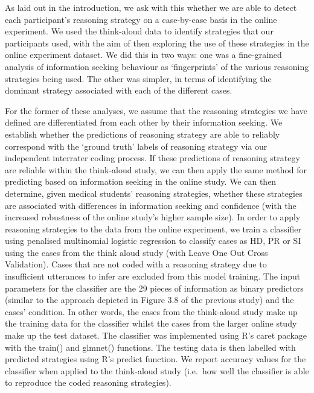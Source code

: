 \documentclass[a4paper, nobind]{templates/ociamthesis}
\begin{document}
As laid out in the introduction, we ask with this whether we are able to detect each participant's reasoning strategy on a case-by-case basis in the online experiment. We used the think-aloud data to identify strategies that our participants used, with the aim of then exploring the use of these strategies in the online experiment dataset. We did this in two ways: one was a fine-grained analysis of information seeking behaviour as `fingerprints' of the various reasoning strategies being used. The other was simpler, in terms of identifying the dominant strategy associated with each of the different cases.

For the former of these analyses, we assume that the reasoning strategies we have defined are differentiated from each other by their information seeking. We establish whether the predictions of reasoning strategy are able to reliably correspond with the `ground truth' labels of reasoning strategy via our independent interrater coding process. If these predictions of reasoning strategy are reliable within the think-aloud study, we can then apply the same method for predicting based on information seeking in the online study. We can then determine, given medical students' reasoning strategies, whether these strategies are associated with differences in information seeking and confidence (with the increased robustness of the online study's higher sample size). In order to apply reasoning strategies to the data from the online experiment, we train a classifier using penalised multinomial logistic regression to classify cases as HD, PR or SI using the cases from the think aloud study (with Leave One Out Cross Validation). Cases that are not coded with a reasoning strategy due to insufficient utterances to infer are excluded from this model training. The input parameters for the classifier are the 29 pieces of information as binary predictors (similar to the approach depicted in Figure 3.8 of the previous study) and the cases' condition. In other words, the cases from the think-aloud study make up the training data for the classifier whilst the cases from the larger online study make up the test dataset. The classifier was implemented using R's caret package with the train() and glmnet() functions. The testing data is then labelled with predicted strategies using R's predict function. We report accuracy values for the classifier when applied to the think-aloud study (i.e.~how well the classifier is able to reproduce the coded reasoning strategies).\\
\end{document}
